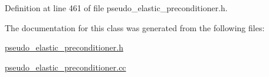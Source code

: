 Definition at line 461 of file pseudo\+\_\+elastic\+\_\+preconditioner.\+h.



The documentation for this class was generated from the following files\+:\begin{DoxyCompactItemize}
\item 
\hyperlink{pseudo__elastic__preconditioner_8h}{pseudo\+\_\+elastic\+\_\+preconditioner.\+h}\item 
\hyperlink{pseudo__elastic__preconditioner_8cc}{pseudo\+\_\+elastic\+\_\+preconditioner.\+cc}\end{DoxyCompactItemize}
